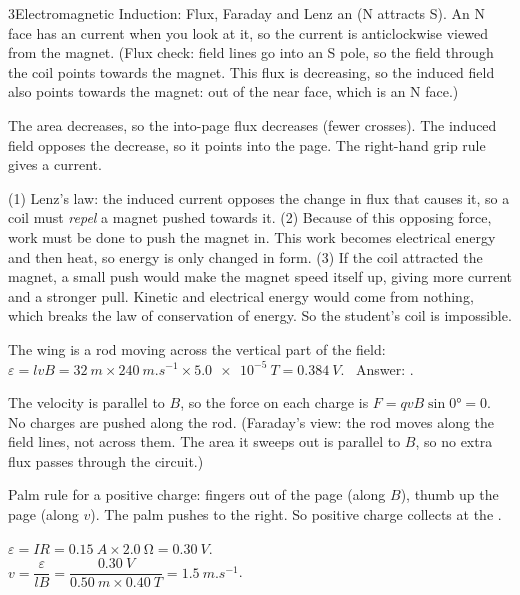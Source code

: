 \begin{chapteranswers}{3}{Electromagnetic Induction: Flux, Faraday and Lenz}
        an  (N attracts S). An N face has an 
        current when you look at it, so the current is anticlockwise viewed from
        the magnet. (Flux check: field lines go into an S pole, so the field
        through the coil points towards the magnet. This flux is decreasing, so
        the induced field also points towards the magnet: out of the near face,
        which is an N face.)
  \item The area decreases, so the into-page flux decreases (fewer crosses). The
        induced field opposes the decrease, so it points into the page. The
        right-hand grip rule gives a  current.
  \item (1) Lenz's law: the induced current opposes the change in flux that causes
        it, so a coil must \emph{repel} a magnet pushed towards it. (2) Because of
        this opposing force, work must be done to push the magnet in. This work
        becomes electrical energy and then heat, so energy is only changed in
        form. (3) If the coil attracted the magnet, a small push would make the
        magnet speed itself up, giving more current and a stronger pull.
        Kinetic and electrical energy would come from nothing, which breaks the
        law of conservation of energy. So the student's coil is impossible.
  \item The wing is a rod moving across the vertical part of the field:
        $\varepsilon = lvB = \qty{32}{m} \times \qty{240}{m.s^{-1}} \times \qty{5.0e-5}{T}
        = \qty{0.384}{V}$. \ Answer: .
  \item {} The velocity is parallel to $B$, so the force on each charge is
        $F = qvB\sin\ang{0} = 0$. No charges are pushed along the rod.
        (Faraday's view: the rod moves along the field lines, not across them.
        The area it sweeps out is parallel to $B$, so no extra flux passes
        through the circuit.)
  \item Palm rule for a positive charge: fingers out of the page (along $B$), thumb
        up the page (along $v$). The palm pushes to the right. So positive charge
        collects at the .
  \item $\varepsilon = IR = \qty{0.15}{A} \times \qty{2.0}{\ohm} = \qty{0.30}{V}$.\\[4pt]
        $v = \dfrac{\varepsilon}{lB} = \dfrac{\qty{0.30}{V}}{\qty{0.50}{m} \times \qty{0.40}{T}}
        = \qty{1.5}{m.s^{-1}}$.\\[4pt]

\end{chapteranswers}
